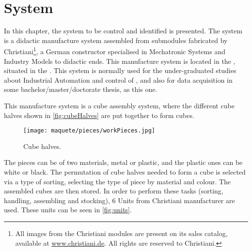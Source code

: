 
\chapter{System}
\label{cha:system}
In this chapter, the system to be control and identified is presented.
The system is a didactic manufacture system assembled from submodules fabricated
by Christiani\footnote{All images from the Christiani modules are present on its sales
  catalog, available at \url{www.christiani.de}. All rights are reserved to Christiani.}, a German
constructor specialised in Mechatronic Systems and Industry Models to
didactic ends.
This manufacture system is located in the \LCA, situated in the \UFRJ. This
system is normally used for the under-graduated studies about Industrial
Automation and control of \DESs, and also for data acquisition in some
bachelor\slash master\slash doctorate thesis, as this one.

This manufacture system is a cube assembly system, where the different cube
halves shown in \autoref{fig:cubeHalves} are put together to form cubes.
\begin{figure}[H]
  \centering
  \texttt{[image: maquete/pieces/workPieces.jpg]}
  \caption{Cube halves.}
  \label{fig:cubeHalves}
\end{figure}

The pieces can be of two materials, metal or plastic, and the plastic ones can
be white or black.
The
permutation of cube halves needed to form a cube is selected via a type of
sorting, selecting the type of piece by material and colour. The assembled cubes
are then stored. In order to perform these tasks (sorting, handling, assembling
and stocking), 6 Units from Christiani manufacturer are used. These units can be
seen in \autoref{fig:units}.

